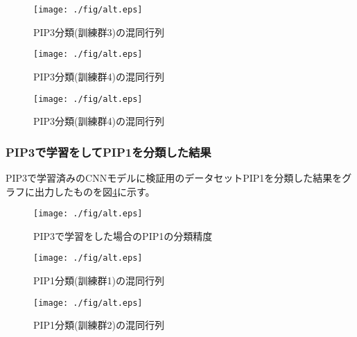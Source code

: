 		\begin{figure}[htbp]
			\begin{center}
			  \texttt{[image: ./fig/alt.eps]}
			  \caption{PIP3分類(訓練群3)の混同行列}
			  \label{fig:3_2}
			\end{center}
		\end{figure}

		\begin{figure}[htbp]
			\begin{center}			  
			  \texttt{[image: ./fig/alt.eps]}
			  \caption{PIP3分類(訓練群4)の混同行列}
			  \label{fig:3_2}
			\end{center}
		\end{figure}

		\begin{figure}[htbp]
			\begin{center}			  			  
			  \texttt{[image: ./fig/alt.eps]}
			  \caption{PIP3分類(訓練群4)の混同行列}
			  \label{fig:3_2}
			\end{center}
		\end{figure}

		\subsubsection{PIP3で学習をしてPIP1を分類した結果}
		PIP3で学習済みのCNNモデルに検証用のデータセットPIP1を分類した結果をグラフに出力したものを図\ref{fig:3_1}に示す。
		\begin{figure}[htbp]
			\begin{center}
			  \texttt{[image: ./fig/alt.eps]}
			  \caption{PIP3で学習をした場合のPIP1の分類精度}
			  \label{fig:3_1}
			\end{center}
		\end{figure}

		\begin{figure}[htbp]
			\begin{center}
			  \texttt{[image: ./fig/alt.eps]}
			  \caption{PIP1分類(訓練群1)の混同行列}
			  \label{fig:3_2}
			\end{center}
		\end{figure}
		\begin{figure}[htbp]
			\begin{center}
			  \texttt{[image: ./fig/alt.eps]}
			  \caption{PIP1分類(訓練群2)の混同行列}
			  \label{fig:3_2}
			\end{center}
		\end{figure}

